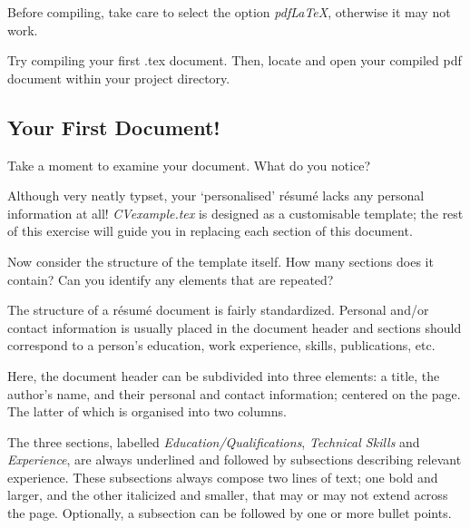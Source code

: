 Before compiling, take care to select the option \emph{pdfLaTeX}, otherwise it may not work. \par

\begin{instrct}
Try compiling your first .tex document. Then, locate and open your compiled pdf document within your project directory.
\end{instrct}

\subsection{Your First Document!}
Take a moment to examine your document. What do you notice? 

Although very neatly typset, your `personalised' r\'esum\'e lacks any personal information at all! \emph{CVexample.tex} is designed as a customisable template; the rest of this exercise will guide you in replacing each section of this document. \par

Now consider the structure of the template itself. How many sections does it contain? Can you identify any elements that are repeated? \par

The structure of a r\'esum\'e document is fairly standardized. Personal and/or contact information is usually placed in the document header and sections should correspond to a person's education, work experience, skills, publications, etc. \par

Here, the document header can be subdivided into three elements: a title, the author's name, and their personal and contact information; centered on the page. The latter of which is organised into two columns. \par 

The three sections, labelled \emph{Education/Qualifications}, \emph{Technical Skills} and \emph{Experience}, are always underlined and followed by subsections describing relevant experience. These subsections always compose two lines of text; one bold and larger, and the other italicized and smaller, that may or may not extend across the page. Optionally, a subsection can be followed by one or more bullet points. \par